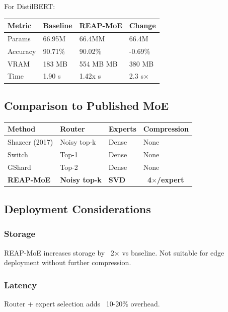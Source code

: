 For DistilBERT:

\begin{table}[H]
\centering
\small
\begin{tabular}{llll}
\toprule
\textbf{Metric} & \textbf{Baseline} & \textbf{REAP-MoE} & \textbf{Change} \\
\midrule
Params & 66.95M & 66.4MM & 66.4M \\
Accuracy & 90.71\% & 90.02\% & -0.69\% \\
VRAM & 183 MB & 554 MB MB & 380 MB \\
Time & 1.90 s & 1.42x s & 2.3 s$\times$ \\
\bottomrule
\end{tabular}
\end{table}

\subsection{Comparison to Published MoE}

\begin{table}[H]
\centering
\small
\begin{tabular}{llll}
\toprule
\textbf{Method} & \textbf{Router} & \textbf{Experts} & \textbf{Compression} \\
\midrule
Shazeer (2017) & Noisy top-k & Dense & None \\
Switch & Top-1 & Dense & None \\
GShard & Top-2 & Dense & None \\
\textbf{REAP-MoE} & \textbf{Noisy top-k} & \textbf{SVD} & \textbf{~4$\times$/expert} \\
\bottomrule
\end{tabular}
\end{table}

\subsection{Deployment Considerations}

\subsubsection{Storage}
REAP-MoE increases storage by ~2$\times$ vs baseline. Not suitable for edge 
deployment without further compression.

\subsubsection{Latency}
Router + expert selection adds ~10-20\% overhead.

